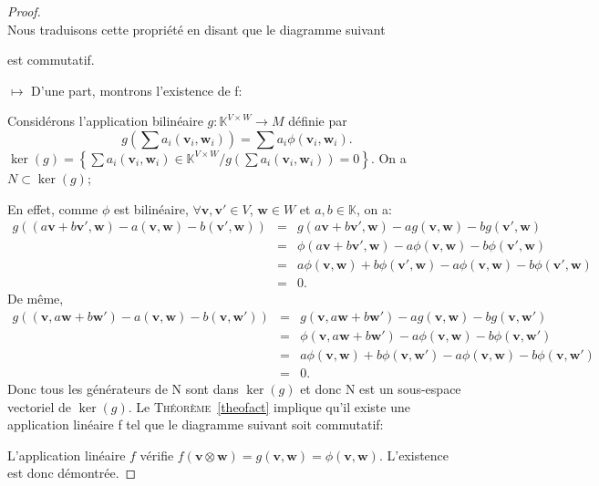 \documentclass[11pt,a4paper,oneside]{book}
\newtheorem{proof}{Démonstration}
\def\K{\mathbb K}
\def\v{\mathbf v}
\def\w{\mathbf w}
\newcommand{\theoref}[1]{\textsc{Théorème}~\ref{#1}}
\begin{document}
\begin{proof}
	\emph{\\}
	Nous traduisons cette propriété en disant que le diagramme suivant 
	\begin{center}
\end{center}est commutatif.

$ \mapsto $ D'une part, montrons l'existence de f:

Considérons l'application bilinéaire $ g:\K^{V\times W} \longrightarrow M$ définie par $$ g\left(\sum a_{i}(\v_{i},\w_{i})\right)=\sum a_{i}\phi(\v_{i},\w_{i}). $$
 $ \ker(g)=\left\{\sum a_{i}(\v_{i},\w_{i})\in\K^{V\times W}/g\left(\sum a_{i}(\v_{i},\w_{i})\right)=0\right\} $. On a $ N\subset \ker(g) $;

En effet, comme $ \phi $ est bilinéaire, $ \forall \v,\v'\in V $, $ \w\in W $ et $ a,b\in\K $, on a:
\begin{eqnarray}
g((a\v+b\v',\w)-a(\v,\w)-b(\v',\w))&=&g(a\v+b\v',\w)-ag(\v,\w)-bg(\v',\w)\nonumber\\
&=&\phi(a\v+b\v',\w)-a\phi(\v,\w)-b\phi(\v',\w) \nonumber\\
&=&a\phi(\v,\w)+b\phi(\v',\w)-a\phi(\v,\w)-b\phi(\v',\w)\nonumber\\
&=&0.\nonumber
\end{eqnarray}
De même,
\begin{eqnarray}
g((\v,a\w+b\w')-a(\v,\w)-b(\v,\w'))&=&g(\v,a\w+b\w')-ag(\v,\w)-bg(\v,\w')\nonumber\\
&=&\phi(\v,a\w+b\w')-a\phi(\v,\w)-b\phi(\v,\w') \nonumber\\
&=&a\phi(\v,\w)+b\phi(\v,\w')-a\phi(\v,\w)-b\phi(\v,\w')\nonumber\\
&=&0.\nonumber
\end{eqnarray}
Donc tous les générateurs de N sont dans $ \ker(g) $ et donc N est un sous-espace vectoriel de $ \ker(g) $. Le \theoref{theofact} implique qu'il existe une application linéaire f tel que le diagramme suivant soit commutatif:	\begin{center}
\end{center}
L'application linéaire $ f $ vérifie $ f(\v\otimes \w) =g(\v,\w)=\phi(\v,\w)$. L'existence est donc démontrée.
  

\end{proof}
\end{document}
